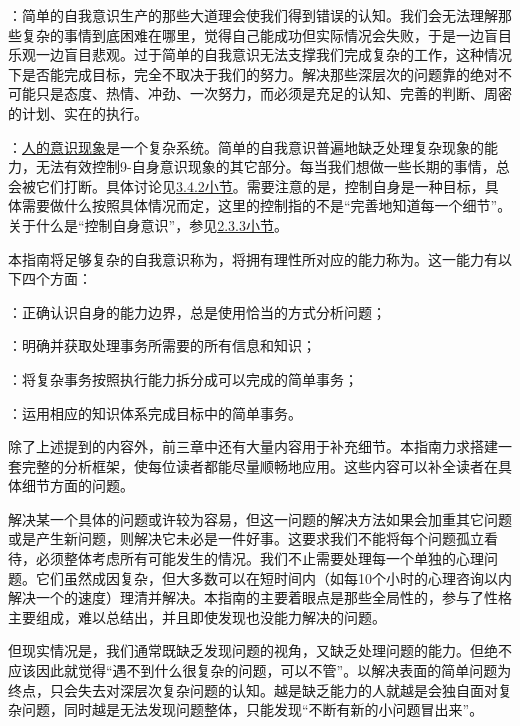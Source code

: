 ：简单的自我意识生产的那些大道理会使我们得到错误的认知。我们会无法理解那些复杂的事情到底困难在哪里，觉得自己能成功但实际情况会失败，于是一边盲目乐观一边盲目悲观。过于简单的自我意识无法支撑我们完成复杂的工作，这种情况下是否能完成目标，完全不取决于我们的努力。解决那些深层次的问题靠的绝对不可能只是态度、热情、冲劲、一次努力，而必须是充足的认知、完善的判断、周密的计划、实在的执行。

：\hyperref[def:意识现象]{人的意识现象}是一个复杂系统。简单的自我意识普遍地缺乏处理复杂现象的能力，无法有效控制9-自身意识现象的其它部分。每当我们想做一些长期的事情，总会被它们打断。具体讨论见\hyperref[sec:缺失、关联与外溢]{3.4.2小节}。需要注意的是，控制自身是一种目标，具体需要做什么按照具体情况而定，这里的控制指的不是“完善地知道每一个细节”。关于什么是“控制自身意识”，参见\hyperref[sec:自控]{2.3.3小节}。
\vspace{10pt}

本指南将足够复杂的自我意识称为，将拥有理性所对应的能力称为\hyperref[sec:现实事务处理能力]{}。这一能力有以下四个方面：

：正确认识自身的能力边界，总是使用恰当的方式分析问题；

：明确并获取处理事务所需要的所有信息和知识；

：将复杂事务按照执行能力拆分成可以完成的简单事务；

：运用相应的知识体系完成目标中的简单事务。

除了上述提到的内容外，前三章中还有大量内容用于补充细节。本指南力求搭建一套完整的分析框架，使每位读者都能尽量顺畅地应用。这些内容可以补全读者在具体细节方面的问题。

\divider

解决某一个具体的问题或许较为容易，但这一问题的解决方法如果会加重其它问题或是产生新问题，则解决它未必是一件好事。这要求我们不能将每个问题孤立看待，必须整体考虑所有可能发生的情况。我们不止需要处理每一个单独的心理问题。它们虽然成因复杂，但大多数可以在短时间内（如每10个小时的心理咨询以内解决一个的速度）理清并解决。本指南的主要着眼点是那些全局性的，参与了性格主要组成，难以总结出，并且即使发现也没能力解决的问题。

但现实情况是，我们通常既缺乏发现问题的视角，又缺乏处理问题的能力。但绝不应该因此就觉得“遇不到什么很复杂的问题，可以不管”。以解决表面的简单问题为终点，只会失去对深层次复杂问题的认知。越是缺乏能力的人就越是会独自面对复杂问题，同时越是无法发现问题整体，只能发现“不断有新的小问题冒出来”。

